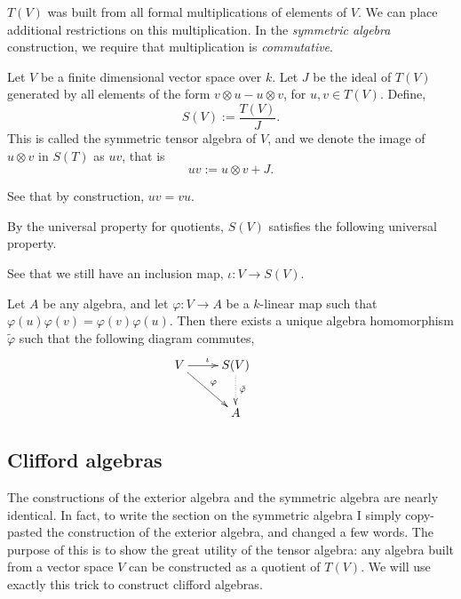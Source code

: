 \documentclass{owmaths}
\begin{document}
$T(V)$ was built from all formal multiplications of elements of $V$. We 
can place additional restrictions on this multiplication. In the \emph{symmetric algebra}
construction, we require that multiplication is \emph{commutative}.
\begin{definition}
    Let $V$ be a finite dimensional vector space over $k$. 
    Let $J$ be the ideal of $T(V)$ generated by all elements of the form
    $v \otimes u - u\otimes v$, for $u,v \in T(V)$.
    Define,
    \begin{equation*}
        S(V) := \frac{T(V)}{J}.
    \end{equation*}
    This is called the symmetric tensor algebra of $V$, and we denote
    the image of $u \otimes v$ in $S(T)$ as $uv$, that is
    \begin{equation*}
        uv := u \otimes v + J.
    \end{equation*}
    
    See that by construction, $uv = vu$.
\end{definition}

By the universal property for quotients, $S(V)$ satisfies the following
universal property.
\begin{proposition}
    See that we still have an inclusion map, $\iota:V\rightarrow S(V)$.
    
    Let $A$ be any algebra, and let $\varphi:V\rightarrow A$
    be a $k$-linear map such that $\varphi(u)\varphi(v) = \varphi(v)\varphi(u)$. Then there exists
    a unique algebra homomorphism $\tilde{\varphi}$ such that the following diagram
    commutes,
    \begin{displaymath}
    \xymatrix{
        V \ar[r]^\iota \ar[rd]^\varphi&
        S(V) \ar@{.>}[d]^{\tilde{\varphi}}&\\
        &
        A
    }   
    \end{displaymath}
\end{proposition}

\subsection{Clifford algebras}
The constructions of the exterior algebra and the symmetric algebra are nearly
identical. In fact, to write the section on the symmetric algebra I simply
copy-pasted the construction of the exterior algebra, and changed a few words.
The purpose of this is to show the great utility of the tensor algebra: any
algebra built from a vector space $V$ can be constructed as a quotient
of $T(V)$. We will use exactly this trick to construct clifford algebras. 
\end{document}
